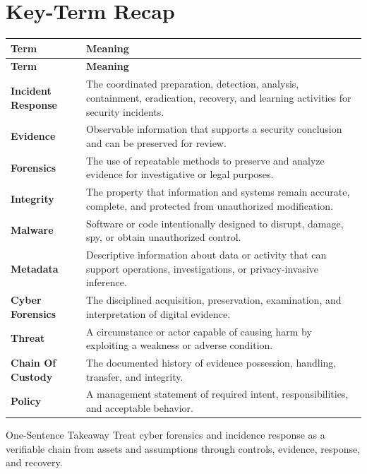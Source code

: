 \documentclass[11pt,letterpaper]{article}
\begin{document}
\section*{Key-Term Recap}
\begin{longtable}{>{\raggedright\arraybackslash}p{}>{\raggedright\arraybackslash}p{}}
\toprule\rowcolor{Navy}\color{white}\textbf{Term} & \color{white}\textbf{Meaning}\\\midrule
\endfirsthead
\toprule\rowcolor{Navy}\color{white}\textbf{Term} & \color{white}\textbf{Meaning}\\\midrule
\endhead
\textbf{Incident Response} & The coordinated preparation, detection, analysis, containment, eradication, recovery, and learning activities for security incidents. \\\midrule
\textbf{Evidence} & Observable information that supports a security conclusion and can be preserved for review. \\\midrule
\textbf{Forensics} & The use of repeatable methods to preserve and analyze evidence for investigative or legal purposes. \\\midrule
\textbf{Integrity} & The property that information and systems remain accurate, complete, and protected from unauthorized modification. \\\midrule
\textbf{Malware} & Software or code intentionally designed to disrupt, damage, spy, or obtain unauthorized control. \\\midrule
\textbf{Metadata} & Descriptive information about data or activity that can support operations, investigations, or privacy-invasive inference. \\\midrule
\textbf{Cyber Forensics} & The disciplined acquisition, preservation, examination, and interpretation of digital evidence. \\\midrule
\textbf{Threat} & A circumstance or actor capable of causing harm by exploiting a weakness or adverse condition. \\\midrule
\textbf{Chain Of Custody} & The documented history of evidence possession, handling, transfer, and integrity. \\\midrule
\textbf{Policy} & A management statement of required intent, responsibilities, and acceptable behavior. \\\midrule
\bottomrule
\end{longtable}
\begin{CornellExamBox}{One-Sentence Takeaway}
Treat cyber forensics and incidence response as a verifiable chain from assets and assumptions through controls, evidence, response, and recovery.
\end{CornellExamBox}
\end{document}
